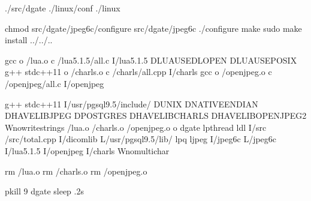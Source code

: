 \documentclass[letterpaper,10pt,english]{sphinxmanual}
\begin{document}
%
\begin{sphinxVerbatim}[commandchars=\\\{\}]

./src/dgate
./linux/conf
./linux

chmod  src/dgate/jpeg\PYGZhy{}6c/configure
 src/dgate/jpeg\PYGZhy{}6c
./configure
make
sudo make install
 ../../..

 
gcc \PYGZhy{}o /lua.o \PYGZhy{}c /lua\PYGZus{}5.1.5/all.c \PYGZhy{}I/lua\PYGZus{}5.1.5 \PYGZhy{}DLUA\PYGZus{}USE\PYGZus{}DLOPEN \PYGZhy{}DLUA\PYGZus{}USE\PYGZus{}POSIX
g++ \PYGZhy{}stdc++11 \PYGZhy{}o /charls.o \PYGZhy{}c /charls/all.cpp \PYGZhy{}I/charls
gcc \PYGZhy{}o /openjpeg.o \PYGZhy{}c /openjpeg/all.c \PYGZhy{}I/openjpeg

g++ \PYGZhy{}stdc++11 \PYGZhy{}I/usr/pgsql\PYGZhy{}9.5/include/ \PYGZhy{}DUNIX \PYGZhy{}DNATIVE\PYGZus{}ENDIAN \PYGZhy{}DHAVE\PYGZus{}LIBJPEG \PYGZhy{}DPOSTGRES \PYGZhy{}DHAVE\PYGZus{}LIBCHARLS \PYGZhy{}DHAVE\PYGZus{}LIBOPENJPEG2 \PYGZhy{}Wno\PYGZhy{}write\PYGZhy{}strings /lua.o /charls.o /openjpeg.o \PYGZhy{}o dgate \PYGZhy{}lpthread \PYGZhy{}ldl \PYGZhy{}I/src /src/total.cpp \PYGZhy{}I/dicomlib \PYGZhy{}L/usr/pgsql\PYGZhy{}9.5/lib/ \PYGZhy{}lpq  \PYGZhy{}ljpeg \PYGZhy{}I/jpeg\PYGZhy{}6c \PYGZhy{}L/jpeg\PYGZhy{}6c \PYGZhy{}I/lua\PYGZus{}5.1.5 \PYGZhy{}I/openjpeg \PYGZhy{}I/charls \PYGZhy{}Wno\PYGZhy{}multichar

rm /lua.o
rm /charls.o
rm /openjpeg.o

pkill \PYGZhy{}9 dgate
sleep .2s


\end{sphinxVerbatim}
\end{document}
